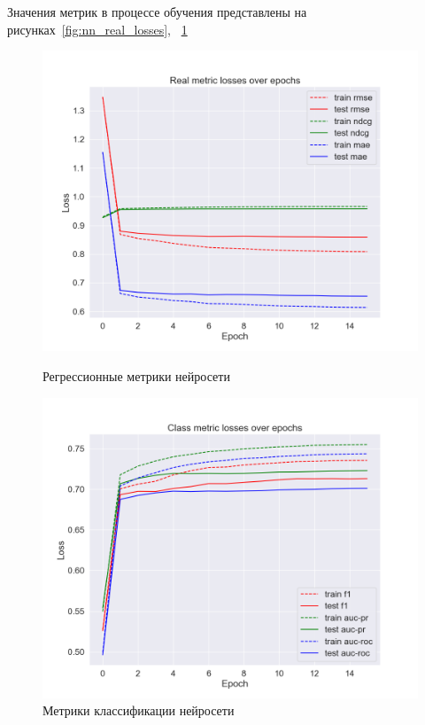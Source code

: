 Значения метрик в процессе обучения представлены на рисунках~\ref{fig:nn_real_losses}, ~\ref{fig:nn_class_losses}

\begin{figure}[h!]
\centering
\begin{minipage}{.5\textwidth}
\centering
\includegraphics[width=1.0\linewidth]{images/neural_net/real_losses}
\caption{Регрессионные метрики нейросети}
\label{fig:nn_real_losses}
\end{minipage}%
\begin{minipage}{.5\textwidth}
\centering
\includegraphics[width=1.0\linewidth]{images/neural_net/class_losses}
\caption{Метрики классификации нейросети}
\label{fig:nn_class_losses}
\end{minipage}
\end{figure}

